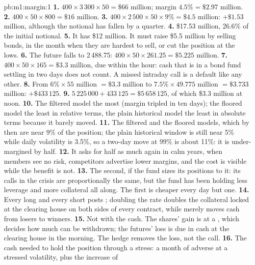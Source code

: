 \begin{solution}{pb:m1:margin:1}
\textbf{1.} $400 \times 3\,300 \times 50 = \$66$ million; margin $4.5\% =
\$2.97$ million.
\textbf{2.} $400 \times 50 \times 800 = \$16$ million.
\textbf{3.} $400 \times 2\,500 \times 50 \times 9\% = \$4.5$ million: $+\$1.53$
million, although the notional has fallen by a quarter.
\textbf{4.} \$17.53 million, 26.6\% of the initial notional.
\textbf{5.} It has \$12 million. It must raise \$5.5 million by selling
bonds, in the month when they are hardest to sell, or cut the position at
the lows.
\textbf{6.} The future falls to 2\,488.75: $400 \times 50 \times 261.25 =
\$5.225$ million.
\textbf{7.} $400 \times 50 \times 165 = \$3.3$ million, due within the hour:
cash that is in a bond fund settling in two days does not count. A missed
intraday call is a default like any other.
\textbf{8.} From $6\% \times 55$ million $= \$3.3$ million to $7.5\% \times
49.775$ million $= \$3.733$ million: $+\$433\,125$.
\textbf{9.} $5\,225\,000 + 433\,125 = \$5\,658\,125$, of which \$3.3 million at
noon.
\textbf{10.} The filtered model the most (margin tripled in ten days); the
floored model the least in relative terms, the plain historical model the
least in absolute terms because it barely moved.
\textbf{11.} The filtered and the floored models, which by then are near
9\% of the position; the plain historical window is still near 5\% while
daily volatility is 3.5\%, so a two-day move at 99\% is about 11\%: it is
under-margined by half.
\textbf{12.} It asks for half as much again in calm years, when members see
no risk, competitors advertise lower margins, and the cost is visible while
the benefit is not.
\textbf{13.} The second, if the fund sizes its positions to it: its calls in
the crisis are proportionally the same, but the fund has been holding less
leverage and more collateral all along. The first is cheaper every day but
one.
\textbf{14.} Every long and every short posts ; doubling the
rate doubles the collateral locked at the clearing house on both sides of
every contract, while  merely moves cash from losers to
winners.
\textbf{15.} Not with the cash. The shares' gain is at a , which
decides how much can be withdrawn; the futures' loss is due in cash at the
clearing house in the morning. The hedge removes the loss, not the call.
\textbf{16.} The cash needed to hold the position through a stress: a month
of adverse  at a stressed volatility, plus the increase of

\end{solution}
